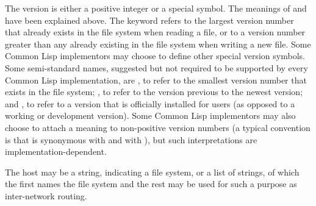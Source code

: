 The version is either a positive integer or a special symbol.  The
meanings of {\nil} and  have been explained
above.  The keyword  refers to the largest version number
that already exists in the file system when reading a file, or to
a version number
greater than any already existing in the file system
when writing a new file.  Some Common Lisp implementors
may choose to define other special version symbols.
Some semi-standard names, suggested but not required to be supported
by every Common Lisp implementation, are
, to refer to the smallest version number that exists
in the file system;
, to refer to the version previous to the newest version;
and , to refer to a version that is officially installed
for users (as opposed to a working or development version).
Some Common Lisp implementors may also choose to attach a meaning to
non-positive version numbers (a typical convention is that 
is synonymous with  and  with ),
but such interpretations are implementation-dependent.

The host may be a string, indicating a file system, or a list
of strings, of which the first names the file system and the rest
may be used for such a purpose as inter-network routing.


